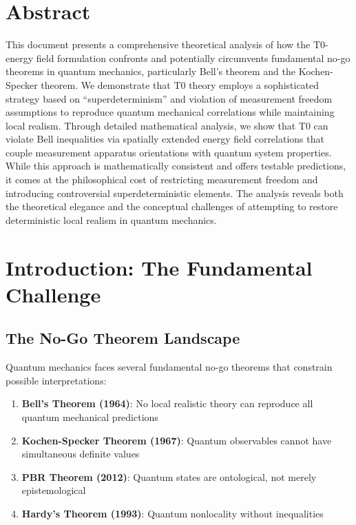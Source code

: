 \section*{Abstract}
		This document presents a comprehensive theoretical analysis of how the T0-energy field formulation confronts and potentially circumvents fundamental no-go theorems in quantum mechanics, particularly Bell's theorem and the Kochen-Specker theorem. We demonstrate that T0 theory employs a sophisticated strategy based on ``superdeterminism'' and violation of measurement freedom assumptions to reproduce quantum mechanical correlations while maintaining local realism. Through detailed mathematical analysis, we show that T0 can violate Bell inequalities via spatially extended energy field correlations that couple measurement apparatus orientations with quantum system properties. While this approach is mathematically consistent and offers testable predictions, it comes at the philosophical cost of restricting measurement freedom and introducing controversial superdeterministic elements. The analysis reveals both the theoretical elegance and the conceptual challenges of attempting to restore deterministic local realism in quantum mechanics.

	
	
	\section{Introduction: The Fundamental Challenge}
	
	\subsection{The No-Go Theorem Landscape}
	
	Quantum mechanics faces several fundamental no-go theorems that constrain possible interpretations:
	
	\begin{enumerate}
		\item \textbf{Bell's Theorem (1964)}: No local realistic theory can reproduce all quantum mechanical predictions
		\item \textbf{Kochen-Specker Theorem (1967)}: Quantum observables cannot have simultaneous definite values
		\item \textbf{PBR Theorem (2012)}: Quantum states are ontological, not merely epistemological
		\item \textbf{Hardy's Theorem (1993)}: Quantum nonlocality without inequalities
	\end{enumerate}
	

